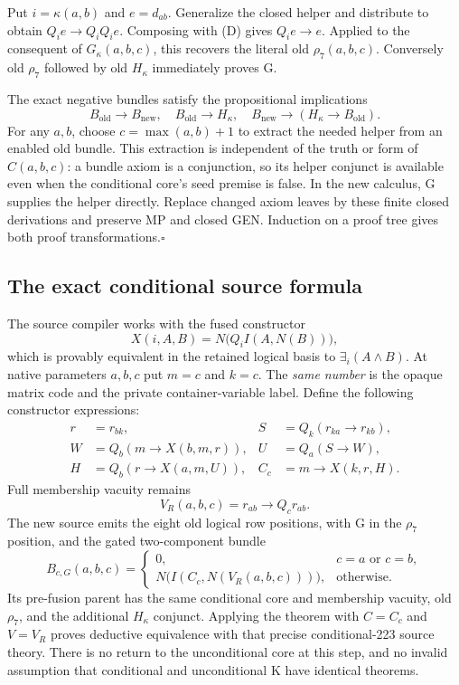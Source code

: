 Put $i=\kappa(a,b)$ and $e=d_{ab}$. Generalize the closed helper and
distribute to obtain $Q_ie\to Q_iQ_ie$. Composing with (D) gives
$Q_ie\to e$. Applied to the consequent of $G_\kappa(a,b,c)$, this
recovers the literal old $\rho_7(a,b,c)$. Conversely old $\rho_7$
followed by old $H_\kappa$ immediately proves G.

The exact negative bundles satisfy the propositional implications
\[
 B_{\mathrm{old}}\to B_{\mathrm{new}},\quad
 B_{\mathrm{old}}\to H_\kappa,\quad
 B_{\mathrm{new}}\to(H_\kappa\to B_{\mathrm{old}}).
\]
For any $a,b$, choose $c=\max(a,b)+1$ to extract the needed helper from
an enabled old bundle. This extraction is independent of the truth or form
of $C(a,b,c)$: a bundle axiom is a conjunction, so its helper conjunct is
available even when the conditional core's seed premise is false. In the
new calculus, G supplies the helper directly. Replace changed axiom leaves
by these finite closed derivations and preserve MP and closed GEN. Induction
on a proof tree gives both proof transformations.\hfill$\square$

\subsection{The exact conditional source formula}

The source compiler works with the fused constructor
\[
 X(i,A,B)=N\bigl(Q_i I(A,N(B))\bigr),
\]
which is provably equivalent in the retained logical basis to
$\exists_i(A\wedge B)$. At native parameters $a,b,c$ put $m=c$ and
$k=c$. The \emph{same number} is the opaque matrix code and the private
container-variable label. Define the following constructor expressions:
\begin{align*}
 r&=r_{bk},&
 S&=Q_k(r_{ka}\to r_{kb}),\\
 W&=Q_b(m\to X(b,m,r)),&
 U&=Q_a(S\to W),\\
 H&=Q_b(r\to X(a,m,U)),&
 C_c&=m\to X(k,r,H).
\end{align*}
Full membership vacuity remains
\[
 V_R(a,b,c)=r_{ab}\to Q_c r_{ab}.
\]
The new source emits the eight old logical row positions, with G in the
$\rho_7$ position, and the gated two-component bundle
\begin{equation}
 B_{c,G}(a,b,c)=
 \begin{cases}
  0,& c=a\text{ or }c=b,\\
  N\bigl(I(C_c,N(V_R(a,b,c)))\bigr),&\text{otherwise}.
 \end{cases}
 \tag{CG}
\end{equation}
Its pre-fusion parent has the same conditional core and membership vacuity,
old $\rho_7$, and the additional $H_\kappa$ conjunct. Applying the theorem
with $C=C_c$ and $V=V_R$ proves deductive equivalence with that precise
conditional-223 source theory. There is no return to the unconditional core
at this step, and no invalid assumption that conditional and unconditional
K have identical theorems.

